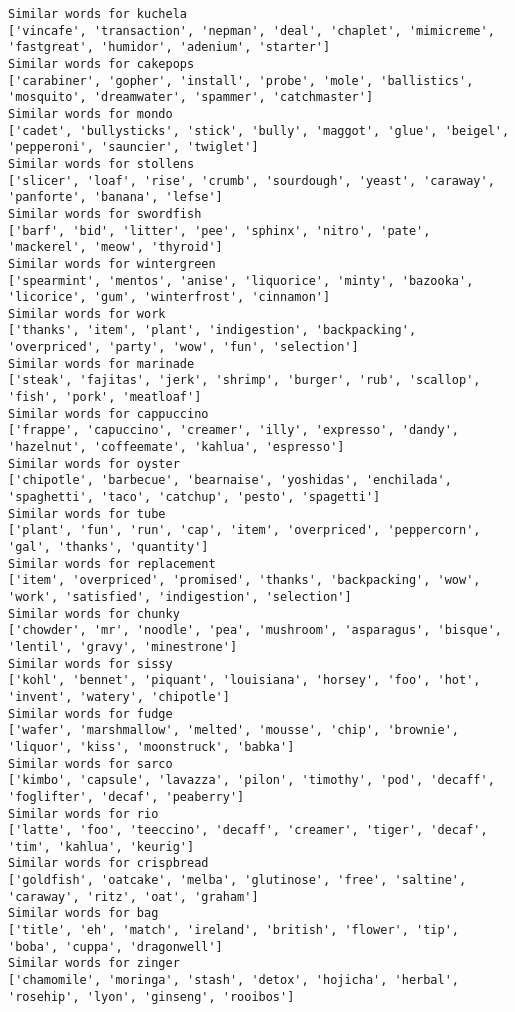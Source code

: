 \documentclass[11pt]{article}
\begin{document}
\begin{Verbatim}[commandchars=\\\{\}]
Similar words for kuchela
['vincafe', 'transaction', 'nepman', 'deal', 'chaplet', 'mimicreme', 'fastgreat', 'humidor', 'adenium', 'starter']
Similar words for cakepops
['carabiner', 'gopher', 'install', 'probe', 'mole', 'ballistics', 'mosquito', 'dreamwater', 'spammer', 'catchmaster']
Similar words for mondo
['cadet', 'bullysticks', 'stick', 'bully', 'maggot', 'glue', 'beigel', 'pepperoni', 'sauncier', 'twiglet']
Similar words for stollens
['slicer', 'loaf', 'rise', 'crumb', 'sourdough', 'yeast', 'caraway', 'panforte', 'banana', 'lefse']
Similar words for swordfish
['barf', 'bid', 'litter', 'pee', 'sphinx', 'nitro', 'pate', 'mackerel', 'meow', 'thyroid']
Similar words for wintergreen
['spearmint', 'mentos', 'anise', 'liquorice', 'minty', 'bazooka', 'licorice', 'gum', 'winterfrost', 'cinnamon']
Similar words for work
['thanks', 'item', 'plant', 'indigestion', 'backpacking', 'overpriced', 'party', 'wow', 'fun', 'selection']
Similar words for marinade
['steak', 'fajitas', 'jerk', 'shrimp', 'burger', 'rub', 'scallop', 'fish', 'pork', 'meatloaf']
Similar words for cappuccino
['frappe', 'capuccino', 'creamer', 'illy', 'expresso', 'dandy', 'hazelnut', 'coffeemate', 'kahlua', 'espresso']
Similar words for oyster
['chipotle', 'barbecue', 'bearnaise', 'yoshidas', 'enchilada', 'spaghetti', 'taco', 'catchup', 'pesto', 'spagetti']
Similar words for tube
['plant', 'fun', 'run', 'cap', 'item', 'overpriced', 'peppercorn', 'gal', 'thanks', 'quantity']
Similar words for replacement
['item', 'overpriced', 'promised', 'thanks', 'backpacking', 'wow', 'work', 'satisfied', 'indigestion', 'selection']
Similar words for chunky
['chowder', 'mr', 'noodle', 'pea', 'mushroom', 'asparagus', 'bisque', 'lentil', 'gravy', 'minestrone']
Similar words for sissy
['kohl', 'bennet', 'piquant', 'louisiana', 'horsey', 'foo', 'hot', 'invent', 'watery', 'chipotle']
Similar words for fudge
['wafer', 'marshmallow', 'melted', 'mousse', 'chip', 'brownie', 'liquor', 'kiss', 'moonstruck', 'babka']
Similar words for sarco
['kimbo', 'capsule', 'lavazza', 'pilon', 'timothy', 'pod', 'decaff', 'foglifter', 'decaf', 'peaberry']
Similar words for rio
['latte', 'foo', 'teeccino', 'decaff', 'creamer', 'tiger', 'decaf', 'tim', 'kahlua', 'keurig']
Similar words for crispbread
['goldfish', 'oatcake', 'melba', 'glutinose', 'free', 'saltine', 'caraway', 'ritz', 'oat', 'graham']
Similar words for bag
['title', 'eh', 'match', 'ireland', 'british', 'flower', 'tip', 'boba', 'cuppa', 'dragonwell']
Similar words for zinger
['chamomile', 'moringa', 'stash', 'detox', 'hojicha', 'herbal', 'rosehip', 'lyon', 'ginseng', 'rooibos']

\end{Verbatim}
\end{document}
